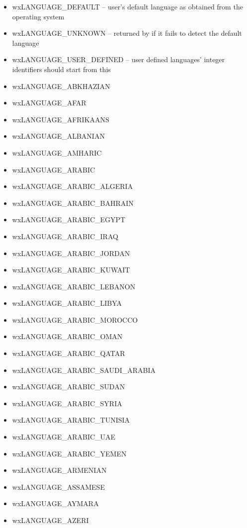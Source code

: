
\begin{itemize}\itemsep=0pt
\item wxLANGUAGE\_DEFAULT -- user's default language as obtained from the operating system 
\item wxLANGUAGE\_UNKNOWN -- returned by 
if it fails to detect the default language 
\item wxLANGUAGE\_USER\_DEFINED -- user defined languages' integer identifiers should start from
this
\item wxLANGUAGE\_ABKHAZIAN
\item wxLANGUAGE\_AFAR
\item wxLANGUAGE\_AFRIKAANS
\item wxLANGUAGE\_ALBANIAN
\item wxLANGUAGE\_AMHARIC
\item wxLANGUAGE\_ARABIC
\item wxLANGUAGE\_ARABIC\_ALGERIA
\item wxLANGUAGE\_ARABIC\_BAHRAIN
\item wxLANGUAGE\_ARABIC\_EGYPT
\item wxLANGUAGE\_ARABIC\_IRAQ
\item wxLANGUAGE\_ARABIC\_JORDAN
\item wxLANGUAGE\_ARABIC\_KUWAIT
\item wxLANGUAGE\_ARABIC\_LEBANON
\item wxLANGUAGE\_ARABIC\_LIBYA
\item wxLANGUAGE\_ARABIC\_MOROCCO
\item wxLANGUAGE\_ARABIC\_OMAN
\item wxLANGUAGE\_ARABIC\_QATAR
\item wxLANGUAGE\_ARABIC\_SAUDI\_ARABIA
\item wxLANGUAGE\_ARABIC\_SUDAN
\item wxLANGUAGE\_ARABIC\_SYRIA
\item wxLANGUAGE\_ARABIC\_TUNISIA
\item wxLANGUAGE\_ARABIC\_UAE
\item wxLANGUAGE\_ARABIC\_YEMEN
\item wxLANGUAGE\_ARMENIAN
\item wxLANGUAGE\_ASSAMESE
\item wxLANGUAGE\_AYMARA
\item wxLANGUAGE\_AZERI

\end{itemize}
